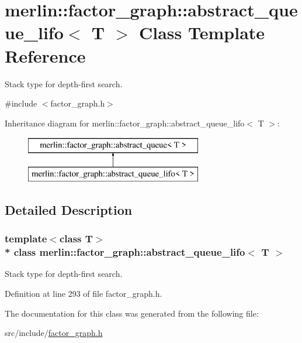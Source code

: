 \hypertarget{classmerlin_1_1factor__graph_1_1abstract__queue__lifo}{}\section{merlin\+:\+:factor\+\_\+graph\+:\+:abstract\+\_\+queue\+\_\+lifo$<$ T $>$ Class Template Reference}
\label{classmerlin_1_1factor__graph_1_1abstract__queue__lifo}


Stack type for depth-\/first search.  




{\ttfamily \#include $<$factor\+\_\+graph.\+h$>$}

Inheritance diagram for merlin\+:\+:factor\+\_\+graph\+:\+:abstract\+\_\+queue\+\_\+lifo$<$ T $>$\+:\begin{figure}[H]
\begin{center}
\leavevmode
\includegraphics[height=2.000000cm]{classmerlin_1_1factor__graph_1_1abstract__queue__lifo}
\end{center}
\end{figure}


\subsection{Detailed Description}
\subsubsection*{template$<$class T$>$\\*
class merlin\+::factor\+\_\+graph\+::abstract\+\_\+queue\+\_\+lifo$<$ T $>$}

Stack type for depth-\/first search. 

Definition at line 293 of file factor\+\_\+graph.\+h.



The documentation for this class was generated from the following file\+:\begin{DoxyCompactItemize}
\item 
src/include/\hyperlink{factor__graph_8h}{factor\+\_\+graph.\+h}\end{DoxyCompactItemize}
